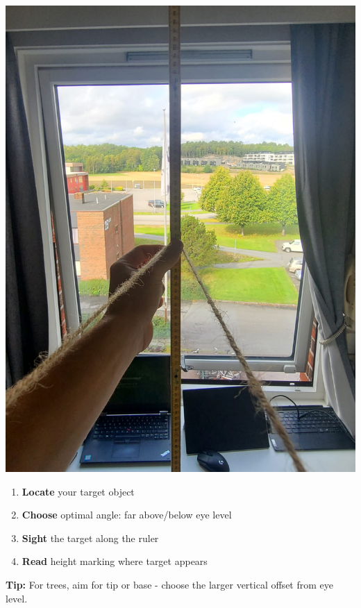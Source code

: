 \documentclass[11pt,a4paper]{article}
\begin{document}
\begin{multicols}{2}
    \includegraphics[width=\linewidth]{pov.jpg}
    
    \columnbreak
    
    \begin{enumerate}[noitemsep]
        \item \textbf{Locate} your target object
        \item \textbf{Choose} optimal angle: far above/below eye level
        \item \textbf{Sight} the target along the ruler
        \item \textbf{Read} height marking where target appears
    \end{enumerate}
    
    \textbf{Tip:} For trees, aim for tip or base - choose the larger vertical offset from eye level.
\end{multicols}
\newpage
\end{document}
